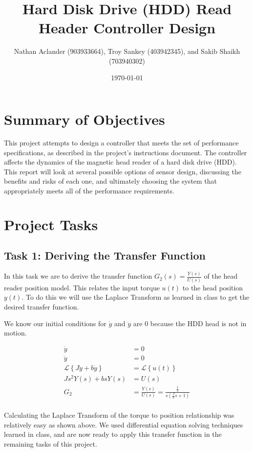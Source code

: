 \documentclass{article}
\title{Hard Disk Drive (HDD) Read Header Controller Design}
\date{\today}
\author{Nathan Aclander (903933664), Troy Sankey (403942345), 
and Sakib Shaikh (703940302)}
\begin{document}
\maketitle
\newpage

\section*{Summary of Objectives}

This project attempts to design a controller that meets the set of performance
specifications, as described in the project's instructions document. The
controller affects the dynamics of the magnetic head reader of a hard disk drive
(HDD). This report will look at several possible options of sensor design,
discussing the benefits and risks of each one, and ultimately choosing the
system that appropriately meets all of the performance requirements.


\section*{Project Tasks}
\subsection*{Task 1: Deriving the Transfer Function}

In this task we are to derive the transfer function $G_2(s) =
\frac{Y(s)}{U(s)}$ of the head reader position model. This relates the
input torque $u(t)$ to the head position $y(t)$. To do this we will
use the Laplace Transform as learned in class to get the desired
transfer function.

We know our initial conditions for $\dot{y}$ and $\ddot{y}$ are $0$
because the HDD head is not in motion.

\begin{align*}
  \dot{y} &= 0 \\
  \ddot{y} &= 0 \\
  \mathcal{L}\left\{ J\ddot{y} + b \dot{y}\right\} &= \mathcal{L}\left\{u(t)\right\} \\
  Js^2 Y(s) + bsY(s) &= U(s) \\
  G_2 &= \frac{Y(s)}{U(s)} = \frac{\frac{1}{b}}{s(\frac{J}{b}s + 1)} \\
\end{align*}

Calculating the Laplace Transform of the torque to position
relationship was relatively easy as shown above. We used differential
equation solving techniques learned in class, and are now ready to
apply this transfer function in the remaining tasks of this project.
\end{document}
